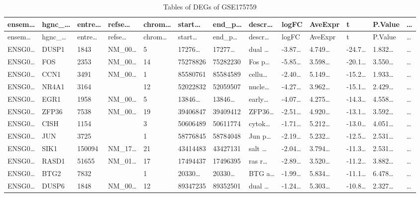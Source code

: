 \documentclass[
]{article}
\begin{document}
\begin{longtable}[]{@{}lllllllllllll@{}}
\caption{\label{tab:tables-of-DEGs-of-GSE175759}Tables of DEGs of GSE175759}\tabularnewline
\toprule
ensem\ldots{} & hgnc\_\ldots{} & entre\ldots{} & refse\ldots{} & chrom\ldots{} & start\ldots{} & end\_p\ldots{} & descr\ldots{} & logFC & AveExpr & t & P.Value & \ldots{}\tabularnewline
\midrule
\endfirsthead
\toprule
ensem\ldots{} & hgnc\_\ldots{} & entre\ldots{} & refse\ldots{} & chrom\ldots{} & start\ldots{} & end\_p\ldots{} & descr\ldots{} & logFC & AveExpr & t & P.Value & \ldots{}\tabularnewline
\midrule
\endhead
ENSG0\ldots{} & DUSP1 & 1843 & NM\_00\ldots{} & 5 & 17276\ldots{} & 17277\ldots{} & dual \ldots{} & -3.87\ldots{} & 4.749\ldots{} & -24.7\ldots{} & 1.832\ldots{} & \ldots{}\tabularnewline
ENSG0\ldots{} & FOS & 2353 & NM\_00\ldots{} & 14 & 75278826 & 75282230 & Fos p\ldots{} & -5.85\ldots{} & 3.598\ldots{} & -20.1\ldots{} & 3.550\ldots{} & \ldots{}\tabularnewline
ENSG0\ldots{} & CCN1 & 3491 & NM\_00\ldots{} & 1 & 85580761 & 85584589 & cellu\ldots{} & -2.40\ldots{} & 5.149\ldots{} & -15.2\ldots{} & 1.933\ldots{} & \ldots{}\tabularnewline
ENSG0\ldots{} & NR4A1 & 3164 & & 12 & 52022832 & 52059507 & nucle\ldots{} & -4.27\ldots{} & 3.962\ldots{} & -15.1\ldots{} & 2.429\ldots{} & \ldots{}\tabularnewline
ENSG0\ldots{} & EGR1 & 1958 & NM\_00\ldots{} & 5 & 13846\ldots{} & 13846\ldots{} & early\ldots{} & -4.07\ldots{} & 4.275\ldots{} & -14.3\ldots{} & 4.558\ldots{} & \ldots{}\tabularnewline
ENSG0\ldots{} & ZFP36 & 7538 & NM\_00\ldots{} & 19 & 39406847 & 39409412 & ZFP36\ldots{} & -2.51\ldots{} & 4.920\ldots{} & -13.1\ldots{} & 3.592\ldots{} & \ldots{}\tabularnewline
ENSG0\ldots{} & CISH & 1154 & & 3 & 50606489 & 50611774 & cytok\ldots{} & -1.71\ldots{} & 5.212\ldots{} & -13.0\ldots{} & 4.051\ldots{} & \ldots{}\tabularnewline
ENSG0\ldots{} & JUN & 3725 & & 1 & 58776845 & 58784048 & Jun p\ldots{} & -2.19\ldots{} & 5.232\ldots{} & -12.5\ldots{} & 2.531\ldots{} & \ldots{}\tabularnewline
ENSG0\ldots{} & SIK1 & 150094 & NM\_17\ldots{} & 21 & 43414483 & 43427131 & salt \ldots{} & -2.04\ldots{} & 3.794\ldots{} & -11.3\ldots{} & 2.531\ldots{} & \ldots{}\tabularnewline
ENSG0\ldots{} & RASD1 & 51655 & NM\_01\ldots{} & 17 & 17494437 & 17496395 & ras r\ldots{} & -2.89\ldots{} & 3.520\ldots{} & -11.2\ldots{} & 3.882\ldots{} & \ldots{}\tabularnewline
ENSG0\ldots{} & BTG2 & 7832 & & 1 & 20330\ldots{} & 20330\ldots{} & BTG a\ldots{} & -1.99\ldots{} & 5.834\ldots{} & -11.1\ldots{} & 6.478\ldots{} & \ldots{}\tabularnewline
ENSG0\ldots{} & DUSP6 & 1848 & NM\_00\ldots{} & 12 & 89347235 & 89352501 & dual \ldots{} & -1.24\ldots{} & 5.303\ldots{} & -10.8\ldots{} & 2.327\ldots{} & \ldots{}\tabularnewline

\end{longtable}
\end{document}
